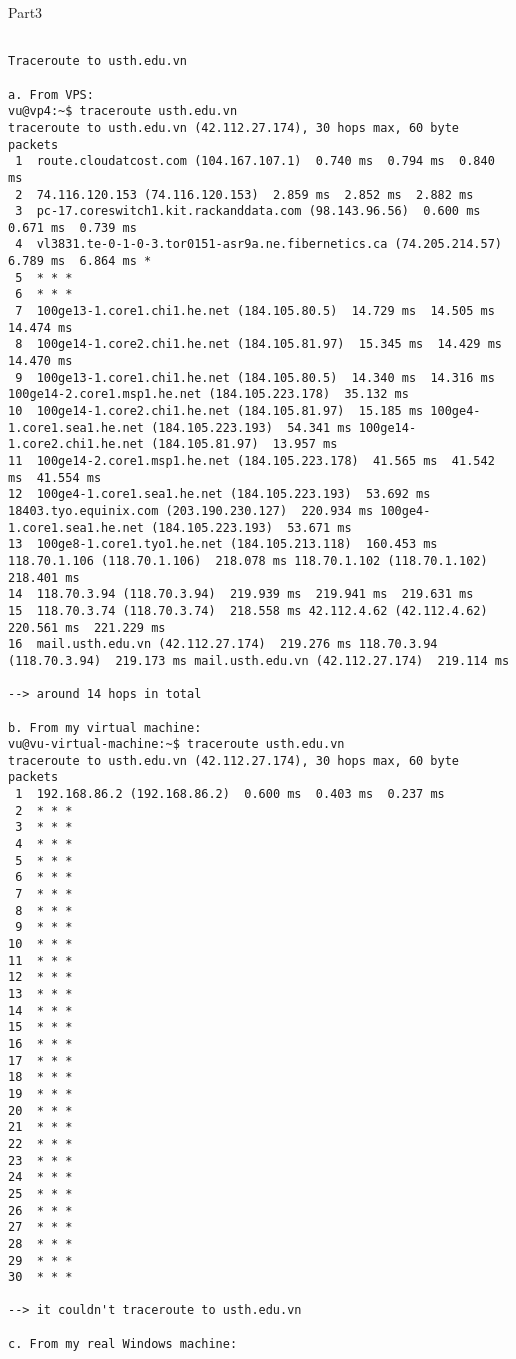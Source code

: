 \documentclass{report}
\begin{document}
\begin{section}{Part3}
\begin{verbatim}

Traceroute to usth.edu.vn

a. From VPS:
vu@vp4:~$ traceroute usth.edu.vn
traceroute to usth.edu.vn (42.112.27.174), 30 hops max, 60 byte packets
 1  route.cloudatcost.com (104.167.107.1)  0.740 ms  0.794 ms  0.840 ms
 2  74.116.120.153 (74.116.120.153)  2.859 ms  2.852 ms  2.882 ms
 3  pc-17.coreswitch1.kit.rackanddata.com (98.143.96.56)  0.600 ms  0.671 ms  0.739 ms
 4  vl3831.te-0-1-0-3.tor0151-asr9a.ne.fibernetics.ca (74.205.214.57)  6.789 ms  6.864 ms *
 5  * * *
 6  * * *
 7  100ge13-1.core1.chi1.he.net (184.105.80.5)  14.729 ms  14.505 ms  14.474 ms
 8  100ge14-1.core2.chi1.he.net (184.105.81.97)  15.345 ms  14.429 ms  14.470 ms
 9  100ge13-1.core1.chi1.he.net (184.105.80.5)  14.340 ms  14.316 ms 100ge14-2.core1.msp1.he.net (184.105.223.178)  35.132 ms
10  100ge14-1.core2.chi1.he.net (184.105.81.97)  15.185 ms 100ge4-1.core1.sea1.he.net (184.105.223.193)  54.341 ms 100ge14-1.core2.chi1.he.net (184.105.81.97)  13.957 ms
11  100ge14-2.core1.msp1.he.net (184.105.223.178)  41.565 ms  41.542 ms  41.554 ms
12  100ge4-1.core1.sea1.he.net (184.105.223.193)  53.692 ms 18403.tyo.equinix.com (203.190.230.127)  220.934 ms 100ge4-1.core1.sea1.he.net (184.105.223.193)  53.671 ms
13  100ge8-1.core1.tyo1.he.net (184.105.213.118)  160.453 ms 118.70.1.106 (118.70.1.106)  218.078 ms 118.70.1.102 (118.70.1.102)  218.401 ms
14  118.70.3.94 (118.70.3.94)  219.939 ms  219.941 ms  219.631 ms
15  118.70.3.74 (118.70.3.74)  218.558 ms 42.112.4.62 (42.112.4.62)  220.561 ms  221.229 ms
16  mail.usth.edu.vn (42.112.27.174)  219.276 ms 118.70.3.94 (118.70.3.94)  219.173 ms mail.usth.edu.vn (42.112.27.174)  219.114 ms

--> around 14 hops in total

b. From my virtual machine:
vu@vu-virtual-machine:~$ traceroute usth.edu.vn
traceroute to usth.edu.vn (42.112.27.174), 30 hops max, 60 byte packets
 1  192.168.86.2 (192.168.86.2)  0.600 ms  0.403 ms  0.237 ms
 2  * * *
 3  * * *
 4  * * *
 5  * * *
 6  * * *
 7  * * *
 8  * * *
 9  * * *
10  * * *
11  * * *
12  * * *
13  * * *
14  * * *
15  * * *
16  * * *
17  * * *
18  * * *
19  * * *
20  * * *
21  * * *
22  * * *
23  * * *
24  * * *
25  * * *
26  * * *
27  * * *
28  * * *
29  * * *
30  * * *

--> it couldn't traceroute to usth.edu.vn

c. From my real Windows machine:


\end{verbatim}
\end{section}
\end{document}
